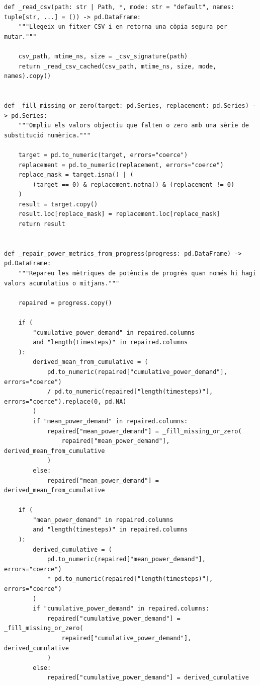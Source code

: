 \documentclass[10pt,a4paper]{article}
\begin{document}
\begin{lstlisting}[style=studioPython,caption={backend/grafics/data\_loader.py},label={lst:backend-grafics-data-loader-py}]
def _read_csv(path: str | Path, *, mode: str = "default", names: tuple[str, ...] = ()) -> pd.DataFrame:
    """Llegeix un fitxer CSV i en retorna una còpia segura per mutar."""

    csv_path, mtime_ns, size = _csv_signature(path)
    return _read_csv_cached(csv_path, mtime_ns, size, mode, names).copy()


def _fill_missing_or_zero(target: pd.Series, replacement: pd.Series) -> pd.Series:
    """Ompliu els valors objectiu que falten o zero amb una sèrie de substitució numèrica."""

    target = pd.to_numeric(target, errors="coerce")
    replacement = pd.to_numeric(replacement, errors="coerce")
    replace_mask = target.isna() | (
        (target == 0) & replacement.notna() & (replacement != 0)
    )
    result = target.copy()
    result.loc[replace_mask] = replacement.loc[replace_mask]
    return result


def _repair_power_metrics_from_progress(progress: pd.DataFrame) -> pd.DataFrame:
    """Repareu les mètriques de potència de progrés quan només hi hagi valors acumulatius o mitjans."""

    repaired = progress.copy()

    if (
        "cumulative_power_demand" in repaired.columns
        and "length(timesteps)" in repaired.columns
    ):
        derived_mean_from_cumulative = (
            pd.to_numeric(repaired["cumulative_power_demand"], errors="coerce")
            / pd.to_numeric(repaired["length(timesteps)"], errors="coerce").replace(0, pd.NA)
        )
        if "mean_power_demand" in repaired.columns:
            repaired["mean_power_demand"] = _fill_missing_or_zero(
                repaired["mean_power_demand"], derived_mean_from_cumulative
            )
        else:
            repaired["mean_power_demand"] = derived_mean_from_cumulative

    if (
        "mean_power_demand" in repaired.columns
        and "length(timesteps)" in repaired.columns
    ):
        derived_cumulative = (
            pd.to_numeric(repaired["mean_power_demand"], errors="coerce")
            * pd.to_numeric(repaired["length(timesteps)"], errors="coerce")
        )
        if "cumulative_power_demand" in repaired.columns:
            repaired["cumulative_power_demand"] = _fill_missing_or_zero(
                repaired["cumulative_power_demand"], derived_cumulative
            )
        else:
            repaired["cumulative_power_demand"] = derived_cumulative


\end{lstlisting}
\end{document}
